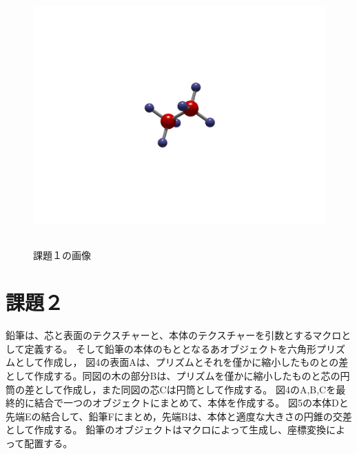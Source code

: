\documentclass[a4j,dvipdfmx,uplatex,11pt]{jsarticle}
\begin{document}
\begin{figure}[h]
\centering
\includegraphics[height=100mm]{kadai_1.png}
\caption{課題１の画像}
\end{figure}

\clearpage

\section{課題２}
鉛筆は、芯と表面のテクスチャーと、本体のテクスチャーを引数とするマクロとして定義する。
そして鉛筆の本体のもととなるあオブジェクトを六角形プリズムとして作成し，
図4の表面Aは、プリズムとそれを僅かに縮小したものとの差として作成する。同図の木の部分Bは、プリズムを僅かに縮小したものと芯の円筒の差として作成し，また同図の芯Cは円筒として作成する。
図4のA,B,Cを最終的に結合で一つのオブジェクトにまとめて、本体を作成する。
図5の本体Dと先端Eの結合して、鉛筆Fにまとめ，先端Bは、本体と適度な大きさの円錐の交差として作成する。
鉛筆のオブジェクトはマクロによって生成し、座標変換によって配置する。
\end{document}
